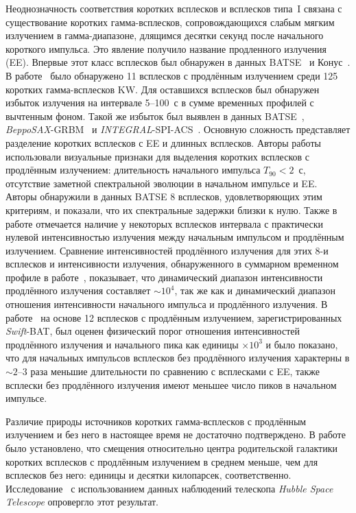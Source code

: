 Неоднозначность соответствия коротких всплесков и всплесков типа~I связана с 
существование коротких гамма-всплесков, сопровождающихся слабым мягким излучением в гамма-диапазоне, 
длящимся десятки секунд после начального короткого импульса. 
Это явление получило название продленного излучения (EE).
Впервые этот класс всплесков был обнаружен в данных BATSE~\citep{Burenin_2000AstL} и 
Конус~\citep{Mazets_2002astro_ph}. В работе~\cite{Frederiks_2004ASPC} 
было обнаружено 11 всплесков с продлённым излучением среди 125 коротких гамма-всплесков KW. 
Для оставшихся всплесков был обнаружен избыток излучения на интервале 5--100~с в сумме временных 
профилей с вычтенным фоном. Такой же избыток был выявлен в данных 
BATSE~\citep{Lazzati_2001AandA, Connaughton_2002ApJ}, \textit{BeppoSAX}-GRBM~\citep{Montanari_2005ApJ} и 
\textit{INTEGRAL}-SPI-ACS~\citep{Minaev_2010AstL}. 
Основную сложность представляет разделение коротких всплесков с EE 
и длинных всплесков. Авторы работы~\citep{Norris_and_Bonnel_2006ApJ} использовали визуальные признаки 
для выделения коротких всплесков с продлённым излучением: длительность начального 
импульса $T_{90}<2$~с, отсутствие заметной спектральной эволюции в начальном 
импульсе и EE. Авторы обнаружили в данных BATSE 8 всплесков, 
удовлетворяющих этим критериям, и показали, что их спектральные задержки близки к нулю. 
Также в работе отмечается наличие у некоторых всплесков интервала с практически нулевой интенсивностью излучения 
между начальным импульсом и продлённым излучением. Сравнение интенсивностей продлённого 
излучения для этих 8-и всплесков и интенсивности излучения, обнаруженного в 
суммарном временном профиле в работе~\citep{Lazzati_2001AandA}, показывает, 
что динамический диапазон интенсивности продлённого излучения составляет $\sim 10^4$, 
так же как и динамический диапазон отношения интенсивности начального импульса и продлённого излучения.
В работе~\citep{Norris_2010ApJ} на основе 12 всплесков с продлённым излучением, зарегистрированных 
\textit{Swift}-BAT, был оценен физический порог отношения интенсивностей продлённого излучения 
и начального пика как единицы $\times 10^3$ и было показано, что для начальных импульсов 
всплесков без продлённого излучения характерны в $\sim 2\textrm{--}3$ раза меньшие длительности
 по сравнению с всплесками с EE, также всплески без продлённого излучения 
имеют меньшее число пиков в начальном импульсе.

Различие природы источников коротких гамма-всплесков с продлённым излучением и 
без него в настоящее время не достаточно подтверждено. В работе~\citep{Troja_2008MNRAS} 
было установлено, что смещения относительно центра родительской галактики 
коротких всплесков с продлённым излучением в среднем меньше, чем для всплесков без него: 
единицы и десятки килопарсек, соответственно. 
Исследование~\citep{Fong_2010ApJ} с использованием данных наблюдений 
телескопа \textit{Hubble Space Telescope} опровергло этот результат.

